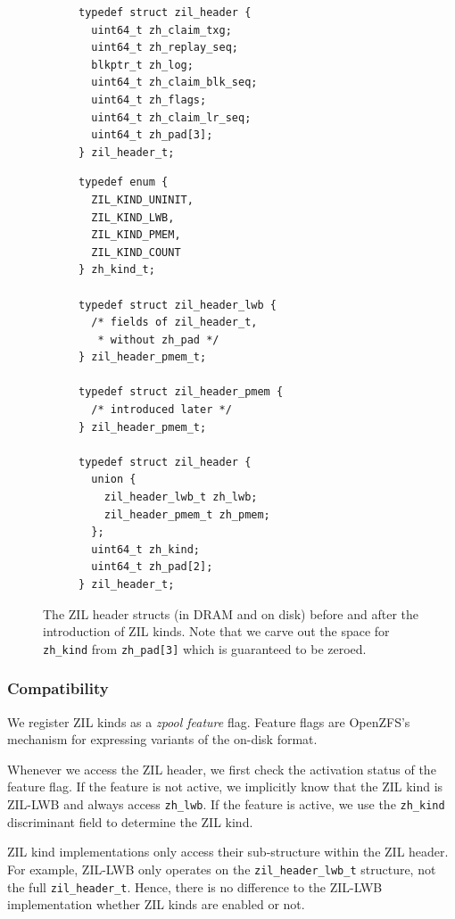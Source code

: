 \documentclass[12pt,a4paper,twoside]{book}
\begin{document}
\begin{figure}[H]
\begin{subfigure}[t]{0.45\textwidth}
\begin{lstlisting}[basicstyle=\scriptsize\ttfamily]
typedef struct zil_header {
  uint64_t zh_claim_txg;
  uint64_t zh_replay_seq;
  blkptr_t zh_log;
  uint64_t zh_claim_blk_seq;
  uint64_t zh_flags;
  uint64_t zh_claim_lr_seq;
  uint64_t zh_pad[3];
} zil_header_t;
\end{lstlisting}
\end{subfigure}
\hfill
\begin{subfigure}[t]{0.5\textwidth}
\begin{lstlisting}[basicstyle=\scriptsize\ttfamily]
typedef enum {
  ZIL_KIND_UNINIT,
  ZIL_KIND_LWB,
  ZIL_KIND_PMEM,
  ZIL_KIND_COUNT
} zh_kind_t;

typedef struct zil_header_lwb {
  /* fields of zil_header_t,
   * without zh_pad */
} zil_header_pmem_t;

typedef struct zil_header_pmem {
  /* introduced later */
} zil_header_pmem_t;

typedef struct zil_header {
  union {
    zil_header_lwb_t zh_lwb;
    zil_header_pmem_t zh_pmem;
  };
  uint64_t zh_kind;
  uint64_t zh_pad[2];
} zil_header_t;

\end{lstlisting}
\end{subfigure}
\caption{The ZIL header structs (in DRAM and on disk) before and after the introduction of ZIL kinds. Note that we carve out the space for \lstinline{zh_kind} from \lstinline{zh_pad[3]} which is guaranteed to be zeroed.}
\label{lst:zil_header_before_and_after}
\end{figure}

\subsubsection{Compatibility}

We register ZIL kinds as a \textit{zpool feature} flag.
Feature flags are OpenZFS's mechanism for expressing variants of the on-disk format.

Whenever we access the ZIL header, we first check the activation status of the feature flag.
If the feature is not active, we implicitly know that the ZIL kind is ZIL-LWB and always access \lstinline{zh_lwb}.
If the feature is active, we use the \lstinline{zh_kind} discriminant field to determine the ZIL kind.

ZIL kind implementations only access their sub-structure within the ZIL header.
For example, ZIL-LWB only operates on the \lstinline{zil_header_lwb_t} structure, not the full \lstinline{zil_header_t}.
Hence, there is no difference to the ZIL-LWB implementation whether ZIL kinds are enabled or not.
\end{document}
